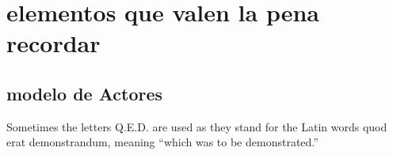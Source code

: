 \chapter{elementos que valen la pena recordar}

\section{modelo de Actores}

Sometimes the letters Q.E.D. are used as they stand for the Latin words quod erat demonstrandum, meaning “which was to be demonstrated.”
